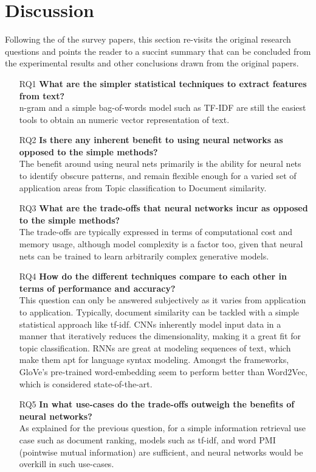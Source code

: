 \documentclass[11pt,a4paper]{article}
\begin{document}


\section{Discussion} %
\label{sec:discussion}

  Following the  of the survey papers, this section re-visits the original research questions and points the reader to a succint summary that can be concluded from the experimental results and other conclusions drawn from the original papers.

  \begin{itemize}
    \item [RQ1] 
    \textbf{What are the simpler statistical techniques to extract features from text?} \\
    n-gram and a simple bag-of-words model such as TF-IDF are still the easiest tools to obtain an numeric vector representation of text.
    \item [RQ2] 
    \textbf{Is there any inherent benefit to using neural networks as opposed to the simple methods?} \\
    The benefit around using neural nets primarily is the ability for neural nets to identify obscure patterns, and remain flexible enough for a varied set of application areas from Topic classification to Document similarity.
    \item [RQ3] 
    \textbf{What are the trade-offs that neural networks incur as opposed to the simple methods?} \\
    The trade-offs are typically expressed in terms of computational cost and memory usage, although model complexity is a factor too, given that neural nets can be trained to learn arbitrarily complex generative models.
    \item [RQ4] 
    \textbf{How do the different techniques compare to each other in terms of performance and accuracy?} \\
    This question can only be answered subjectively as it varies from application to application. Typically, document similarity can be tackled with a simple statistical approach like tf-idf. CNNs inherently model input data in a manner that iteratively reduces the dimensionality, making it a great fit for topic classification. RNNs are great at modeling sequences of text, which make them apt for language syntax modeling. Amongst the frameworks, GloVe's pre-trained word-embedding seem to perform better than Word2Vec, which is considered state-of-the-art.
    \item [RQ5] 
    \textbf{In what use-cases do the trade-offs outweigh the benefits of neural networks?} \\
    As explained for the previous question, for a simple information retrieval use case such as document ranking, models such as tf-idf, and word PMI (pointwise mutual information) are sufficient, and neural networks would be overkill in such use-cases.
  \end{itemize}
\end{document}
